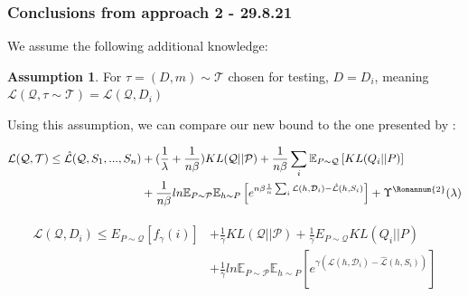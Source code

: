 \documentclass[letterpaper]{article}
\theoremstyle{definition}
\newtheorem{assumption}{Assumption}
\begin{document}


\subsubsection*{Conclusions from approach 2 - 29.8.21}

We assume the following additional knowledge:

\begin{assumption} \label{assumption-known-task}
	For $\tau=(D, m)\sim \mathcal{T}$ chosen for testing, $D=D_i$, meaning $\mathcal{L}(\mathcal{Q}, \tau\sim \mathcal{T})=\mathcal{L}(\mathcal{Q}, D_i)$
\end{assumption}

Using this assumption, we can compare our new bound to the one presented by \cite{Rothfuss2020}:

\begin{align*}
\begin{split}
\mathcal{L}(\mathcal{Q}, \mathcal{T}) \leq \hat{\mathcal{L}}(\mathcal{Q}, S_1,...,S_n) & + (\frac{1}{\lambda}+\frac{1}{n\beta}) KL(\mathcal{Q}||\mathcal{P}) + \frac{1}{n\beta}\sum_i \mathbb{E}_{P\sim \mathcal{Q}} \left [KL(Q_i||P) \right ] \\ & + \frac{1}{n\beta}ln\mathbb{E}_{P\sim \mathcal{P}}\mathbb{E}_{h\sim P}\left [ e^{n\beta\frac{1}{n}\sum_i\mathcal{L}(h,\mathcal{D}_i)- \hat{\mathcal{L}}(h, S_i)} \right ] +\Upsilon^{\text{\Romannum{2}}}(\lambda)
\end{split}
\end{align*}

\begin{align*}
\begin{split}
\mathcal{L}(\mathcal{Q}, D_i)\leq E_{P\sim \mathcal{Q}} \left [ f_{\gamma}(i)\right ] & +  \frac{1}{\gamma}KL(\mathcal{Q}||\mathcal{P}) +\frac{1}{\gamma}E_{P\sim \mathcal{Q}}KL(Q_i||P) \\ & + \frac{1}{\gamma}ln\mathbb{E}_{P\sim \mathcal{P}}\mathbb{E}_{h\sim P}\left [ e^{\gamma(\mathcal{L}(h,\mathcal{D}_i)- \hat{\mathcal{L}}(h, S_i))} \right ]
\end{split}
\end{align*}
\end{document}
